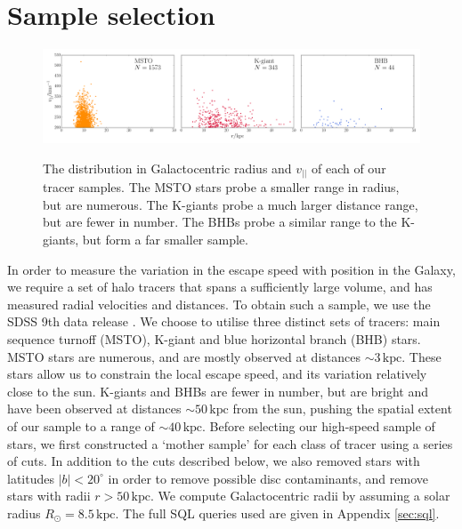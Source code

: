 \documentclass[useAMS,twocolumn,usenatbib]{mn2e}
\def\kpc{{\,\mathrm{kpc}}}
\def\vlos{{v_{||}}}
\begin{document}
\section{Sample selection}

\label{sec:samples}

\begin{figure}
\includegraphics[width=2\columnwidth]{plots/tracer_distributions}\\
\caption{The distribution in Galactocentric radius and $\vlos$ of each of our tracer samples. 
The MSTO stars probe a smaller range in radius, but are numerous. 
The K-giants probe a much larger distance range, but are fewer in number.
The BHBs probe a similar range to the K-giants, but form a far smaller sample.}
\label{fig:data}
\end{figure}


In order to measure the variation in the escape speed with position in the Galaxy, we require a set of halo tracers that spans a sufficiently large volume, and has measured radial velocities and distances. 
To obtain such a sample, we use the SDSS 9th data release \citep{Ah12}. 
We choose to utilise three distinct sets of tracers: main sequence turnoff (MSTO), K-giant and blue horizontal branch (BHB) stars. 
MSTO stars are numerous, and are mostly observed at distances $\sim 3\kpc$. 
These stars allow us to constrain the local escape speed, and its variation relatively close to the sun. 
K-giants and BHBs are fewer in number, but are bright and have been observed at distances $\sim 50\kpc$ from the sun, pushing the spatial extent of our sample to a range of $\sim 40\kpc$. 
Before selecting our high-speed sample of stars, we first constructed a `mother sample' for each class of tracer using a series of cuts. 
In addition to the cuts described below, we also removed stars with latitudes $|b| < 20^\circ$ in order to remove possible disc contaminants, and remove stars with radii $r>50\kpc$. 
We compute Galactocentric radii by assuming a solar radius $R_\odot = 8.5\kpc$. 
The full {\sc SQL} queries used are given in Appendix \ref{sec:sql}.
\end{document}
